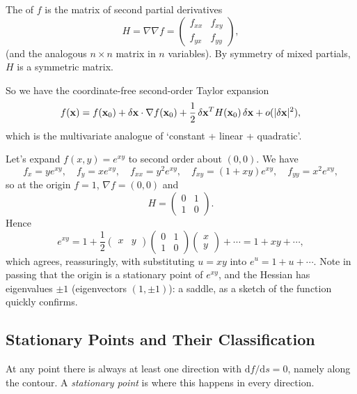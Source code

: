 \documentclass[a4paper]{scrartcl}
\begin{document}
\begin{definition}
	The  of $f$ is the matrix of second partial derivatives
	$$
	H = \nabla \nabla f = \begin{pmatrix} f_{xx} & f_{xy} \\ f_{yx} & f_{yy} \end{pmatrix},
	$$
	(and the analogous $n \times n$ matrix in $n$ variables). By symmetry of mixed partials, $H$ is a symmetric matrix.
\end{definition}

So we have the coordinate-free second-order Taylor expansion
$$
f(\mathbf{x}) = f(\mathbf{x}_0) + \delta \mathbf{x} \cdot \nabla f(\mathbf{x}_0) + \frac{1}{2} \, \delta \mathbf{x}^T H(\mathbf{x}_0) \, \delta \mathbf{x} + o(|\delta \mathbf{x}|^2),
$$
which is the multivariate analogue of `constant + linear + quadratic'.

\begin{example}
	Let's expand $f(x, y) = e^{xy}$ to second order about $(0, 0)$. We have
	$$
	f_x = y e^{xy}, \quad f_y = x e^{xy}, \quad f_{xx} = y^2 e^{xy}, \quad f_{xy} = (1 + xy)e^{xy}, \quad f_{yy} = x^2 e^{xy},
	$$
	so at the origin $f = 1$, $\nabla f = (0, 0)$ and
	$$
	H = \begin{pmatrix} 0 & 1 \\ 1 & 0 \end{pmatrix}.
	$$
	Hence
	$$
	e^{xy} = 1 + \frac{1}{2}\begin{pmatrix} x & y \end{pmatrix}\begin{pmatrix} 0 & 1 \\ 1 & 0\end{pmatrix}\begin{pmatrix} x \\ y \end{pmatrix} + \cdots = 1 + xy + \cdots,
	$$
	which agrees, reassuringly, with substituting $u = xy$ into $e^u = 1 + u + \cdots$. Note in passing that the origin is a stationary point of $e^{xy}$, and the Hessian has eigenvalues $\pm 1$ (eigenvectors $(1, \pm 1)$): a saddle, as a sketch of the function quickly confirms.
\end{example}

\subsection{Stationary Points and Their Classification}

At any point there is always at least one direction with $\mathrm{d}f/\mathrm{d}s = 0$, namely along the contour. A \emph{stationary point} is where this happens in every direction.
\end{document}
